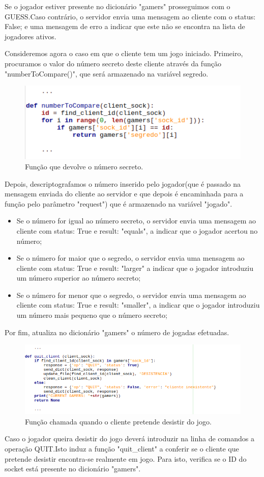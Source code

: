 \documentclass{report}
\begin{document}
Se o jogador estiver presente no dicionário "gamers" prosseguimos com o GUESS.Caso contrário, o servidor envia uma mensagem ao cliente com o status: False; e uma mensagem de erro a indicar que este não se encontra na lista de jogadores ativos.

Consideremos agora o caso em que o cliente tem um jogo iniciado. Primeiro, procuramos o valor do número secreto deste cliente através da função "numberToCompare()", que será armazenado na variável segredo. 
\begin{figure}[H]
        \centering
        \includegraphics[scale=0.65]{numberToCompare}   
        \caption{Função que devolve o número secreto.}
\end{figure}

Depois, descriptografamos o número inserido pelo jogador(que é passado na mensagem enviada do cliente ao servidor e que depois é encaminhada para a função pelo parâmetro "request") que é armazenado na variável "jogado".
\begin{itemize}
\item Se o número for igual ao número secreto, o servidor envia uma mensagem ao cliente com status: True e result: "equals", a indicar que o jogador acertou no número;
\item Se o número for maior que o segredo, o servidor envia uma mensagem ao cliente com status: True e result: "larger" a indicar que o jogador introduziu um número superior ao número secreto;
\item Se o número for menor que o segredo, o servidor envia uma mensagem ao cliente com status: True e result: "smaller", a indicar que o jogador introduziu um número mais pequeno que o número secreto;
\end{itemize}
Por fim, atualiza no dicionário "gamers" o número de jogadas efetuadas.

\begin{figure}[H]
        \centering
        \includegraphics[scale=0.65]{quit_client}       
        \caption{Função chamada quando o cliente pretende desistir do jogo.}
\end{figure}
Caso o jogador queira desistir do jogo deverá introduzir na linha de comandos a operação QUIT.Isto induz  a função "quit\_client" a conferir se o cliente que pretende desistir encontra-se realmente em jogo. Para isto, verifica se o ID do socket está presente no dicionário "gamers".
\end{document}
